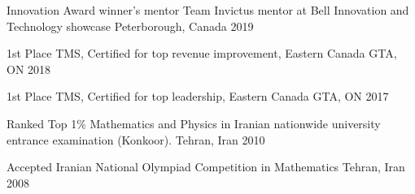 




\begin{cvhonors}

  \cvhonor
    {Innovation Award winner's mentor} %
    {Team Invictus mentor at Bell Innovation and Technology showcase} %
    {Peterborough, Canada} %
    {2019} %
    
  \cvhonor
    {1st Place} %
    {TMS, Certified for top revenue improvement, Eastern Canada} %
    {GTA, ON} %
    {2018} %

  \cvhonor
    {1st Place} %
    {TMS, Certified for top leadership, Eastern Canada} %
    {GTA, ON} %
    {2017} %



    
  \cvhonor
    {Ranked Top 1\%} %
    {Mathematics and Physics in Iranian nationwide university entrance examination (Konkoor).} %
    {Tehran, Iran} %
    {2010} %

  \cvhonor
    {Accepted} %
    {Iranian National Olympiad Competition in Mathematics} %
    {Tehran, Iran} %
    {2008} %

\end{cvhonors}

